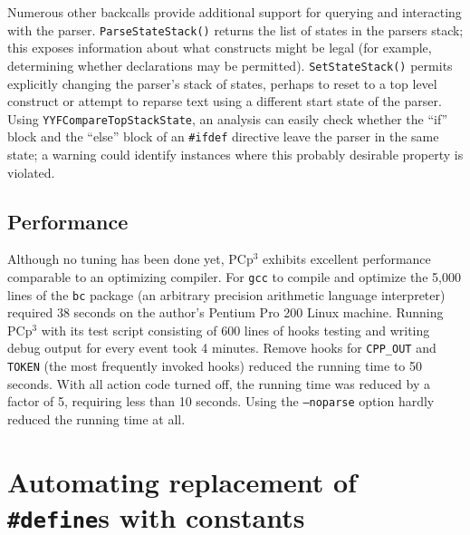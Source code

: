 \documentclass{article}
\newcommand{\pcp}{\mbox{\textsf{PCp}$^3$}}
\newcommand{\ppd}[1]{\texttt{\##1}}
\begin{document}
Numerous other backcalls provide additional support for querying and
interacting with the parser.  \texttt{ParseStateStack()} returns the
list of states in the parsers stack; this exposes information about
what constructs might be legal (for example, determining whether
declarations may be permitted).  \texttt{SetStateStack()} permits
explicitly changing the parser's stack of states, perhaps to reset to a
top level construct or attempt to reparse text using a different start
state of the parser.  Using \texttt{YYFCompareTopStackState}, an
analysis can easily check whether the ``if'' block and the ``else''
block of an \ppd{ifdef} directive leave the parser in the same state;
a warning could identify instances where this probably desirable
property is violated.





\subsection{Performance}

Although no tuning has been done yet, \pcp{} exhibits excellent
performance comparable to an optimizing compiler.  For \texttt{gcc} to
compile and optimize the 5,000 lines of the \texttt{bc} package (an
arbitrary precision arithmetic language interpreter) required 38 seconds
on the author's Pentium Pro 200 Linux machine. Running \pcp{} with its
test script consisting of 600 lines of hooks testing and writing debug
output for every event took 4 minutes.  Remove hooks for
\texttt{CPP\_OUT} and \texttt{TOKEN} (the most frequently invoked hooks)
reduced the running time to 50 seconds.  With all action code turned
off, the running time was reduced by a factor of 5, requiring less than
10 seconds.  Using the \texttt{--noparse} option hardly reduced the
running time at all.

\section{Automating replacement of \ppd{define}s with constants}
\label{sec:xform}
\end{document}
